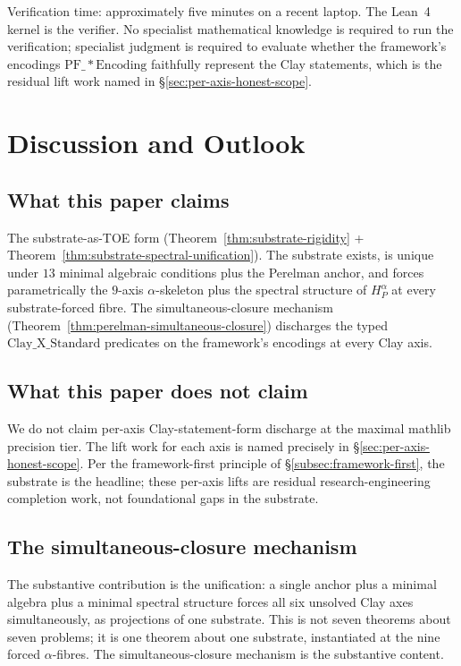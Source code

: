 \documentclass[11pt,a4paper,reqno]{amsart}
\theoremstyle{plain}
\theoremstyle{definition}
\theoremstyle{remark}
\newcommand{\Cstd}[1]{\mathrm{Clay\_#1\_Standard}}
\newcommand{\HP}{H_{P}}
\begin{document}
\noindent Verification time: approximately five minutes on a recent
laptop. The Lean~4 kernel is the verifier. No specialist mathematical
knowledge is required to run the verification; specialist judgment is
required to evaluate whether the framework's encodings
$\mathrm{PF\_*Encoding}$ faithfully represent the Clay statements, which
is the residual lift work named in \S\ref{sec:per-axis-honest-scope}.

\section{Discussion and Outlook}
\label{sec:discussion}

\subsection{What this paper claims}
The substrate-as-TOE form (Theorem~\ref{thm:substrate-rigidity} +
Theorem~\ref{thm:substrate-spectral-unification}). The substrate
exists, is unique under $13$ minimal algebraic conditions plus the
Perelman anchor, and forces parametrically the $9$-axis
$\alpha$-skeleton plus the spectral structure of $\HP^{\alpha}$ at every
substrate-forced fibre. The simultaneous-closure mechanism
(Theorem~\ref{thm:perelman-simultaneous-closure}) discharges the
typed $\Cstd{X}$ predicates on the framework's encodings at every
Clay axis.

\subsection{What this paper does not claim}
We do not claim per-axis Clay-statement-form discharge at the maximal
mathlib precision tier. The lift work for each axis is named precisely
in \S\ref{sec:per-axis-honest-scope}. Per the framework-first principle
of \S\ref{subsec:framework-first}, the substrate is the headline; these
per-axis lifts are residual research-engineering completion work, not
foundational gaps in the substrate.

\subsection{The simultaneous-closure mechanism}
The substantive contribution is the unification: a single anchor plus
a minimal algebra plus a minimal spectral structure forces all six
unsolved Clay axes simultaneously, as projections of one substrate.
This is not seven theorems about seven problems; it is one theorem
about one substrate, instantiated at the nine forced $\alpha$-fibres.
The simultaneous-closure mechanism is the substantive content.
\end{document}
